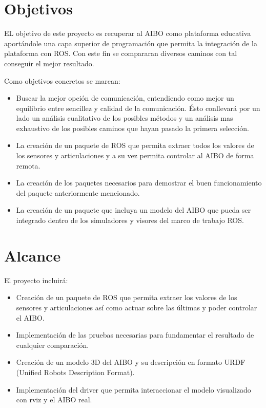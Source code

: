 \documentclass[12pt,a4paper,final,twoside]{book}
\begin{document}
\section{Objetivos}
EL objetivo de este proyecto es recuperar al AIBO como plataforma educativa aportándole una capa superior de programación que permita la integración de la plataforma con ROS.
Con este fin  se compararan diversos caminos con tal conseguir el mejor resultado.

Como objetivos concretos se marcan:
\begin{itemize}
\item Buscar la mejor opción de comunicación, entendiendo como mejor un equilibrio entre sencillez y calidad de la comunicación. Ésto conllevará por un lado  un análisis cualitativo de los posibles métodos y un análisis mas exhaustivo de los posibles caminos que hayan pasado la primera selección.

\item La creación de un paquete de ROS que permita extraer todos los valores de los sensores y articulaciones y a su vez permita controlar al AIBO de forma remota.

\item La creación de los paquetes necesarios para demostrar el buen funcionamiento del paquete anteriormente mencionado.

\item La creación de un paquete que incluya un modelo del AIBO que pueda ser integrado dentro de los simuladores y visores del marco de trabajo ROS. 
\end{itemize}

\section{Alcance}
El proyecto incluirá:
\begin{itemize}
\item Creación de un paquete de ROS que permita extraer los valores de los sensores y articulaciones así como actuar sobre las últimas y poder controlar el AIBO.
\item Implementación de las pruebas necesarias para fundamentar el resultado de cualquier comparación.
\item Creación de un modelo 3D del AIBO y su descripción en formato URDF (Unified Robots Description Format).
\item Implementación del driver que permita interaccionar el modelo visualizado con rviz y el AIBO real.
\end{itemize} 
\end{document}
